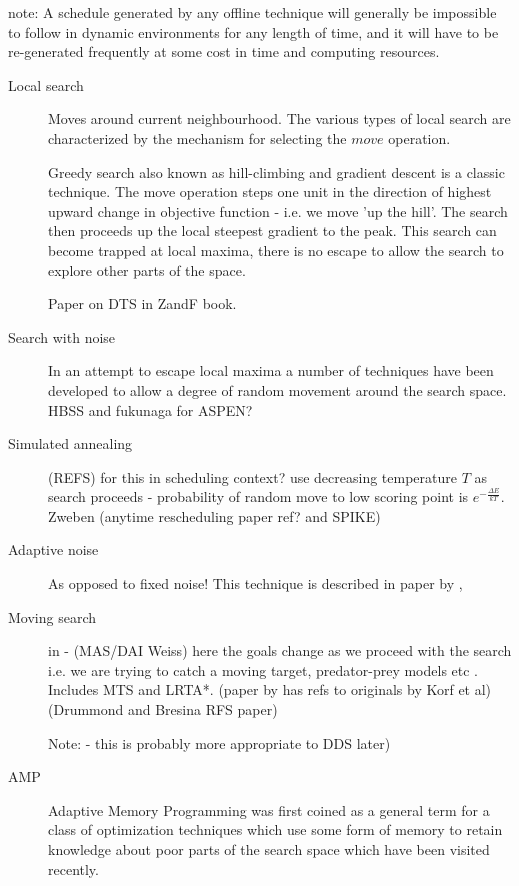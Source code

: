 note:
A schedule generated by any offline technique will generally be impossible to follow in dynamic environments for any length of time, and it will have to be re-generated frequently at some cost in time and computing resources.

\begin{description}
\item[Local search]
Moves around current neighbourhood. The various types of local search are characterized by the mechanism for selecting the $move$ operation.

Greedy search also known as hill-climbing and gradient descent is a classic technique. The move operation steps one unit in the direction of highest upward change in objective function - i.e. we move 'up the hill'. The search then proceeds up the local steepest gradient to the peak. This search can become trapped at local maxima, there is no escape to allow the search to explore other parts of the space.

Paper on DTS in ZandF book.

\item[Search with noise]
In an attempt to escape local maxima a number of techniques have been developed to allow a degree of random movement around the search space. HBSS and fukunaga for ASPEN?


\item[Simulated annealing]
(REFS) for this in scheduling context? use decreasing temperature $T$ as search proceeds - probability of random move to low scoring point is $e^{-\frac{\Delta E}{kT}}$. Zweben (anytime rescheduling paper ref? and SPIKE)

\item[Adaptive noise]
As opposed to fixed noise!
This technique is described in paper by \cite{hoos02adaptive}, 

\item[Moving search]
in \cite{yokoo99search} - (MAS/DAI Weiss) here the goals change as we proceed with the search i.e. we are trying to catch a moving target, predator-prey models etc .
Includes MTS and LRTA*. (paper by \cite{ishida96improving} has refs to originals by Korf et al) (Drummond and Bresina RFS paper)

Note: - this is probably more appropriate to DDS later)

\item[AMP]
Adaptive Memory Programming \cite{taillard98adaptive} was first coined as a general term for a class of optimization techniques which use some form of memory to retain knowledge about poor parts of the search space which have been visited recently.


\end{description}
